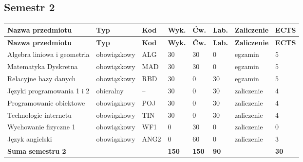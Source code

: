 \documentclass[12pt,a4paper]{article}
\newcommand{\thdrule}{\noalign{\global\setlength{\extrarowheight}{0pt}}}
\newcommand{\thdend}{\noalign{\global\setlength{\extrarowheight}{4pt}}}
\begin{document}
\subsection*{Semestr 2}

{\scriptsize
\begin{longtable}{m{5.0cm}m{1.9cm}m{0.75cm}m{0.85cm}m{0.85cm}m{0.85cm}m{1.45cm}m{0.9cm}}
\thdrule\toprule
\rowcolor{pjatkRed}
{\color{white}\footnotesize\textbf{\vphantom{Ag}Nazwa przedmiotu}} & {\color{white}\footnotesize\textbf{\vphantom{Ag}Typ}} & {\color{white}\footnotesize\textbf{\vphantom{Ag}Kod}} & {\color{white}\footnotesize\textbf{\vphantom{Ag}Wyk.}} & {\color{white}\footnotesize\textbf{\vphantom{Ag}Ćw.}} & {\color{white}\footnotesize\textbf{\vphantom{Ag}Lab.}} & {\color{white}\footnotesize\textbf{\vphantom{Ag}Zaliczenie}} & {\color{white}\footnotesize\textbf{\vphantom{Ag}ECTS}} \\
\midrule\thdend
\endfirsthead
\thdrule\toprule
\rowcolor{pjatkRed}
{\color{white}\footnotesize\textbf{\vphantom{Ag}Nazwa przedmiotu}} & {\color{white}\footnotesize\textbf{\vphantom{Ag}Typ}} & {\color{white}\footnotesize\textbf{\vphantom{Ag}Kod}} & {\color{white}\footnotesize\textbf{\vphantom{Ag}Wyk.}} & {\color{white}\footnotesize\textbf{\vphantom{Ag}Ćw.}} & {\color{white}\footnotesize\textbf{\vphantom{Ag}Lab.}} & {\color{white}\footnotesize\textbf{\vphantom{Ag}Zaliczenie}} & {\color{white}\footnotesize\textbf{\vphantom{Ag}ECTS}} \\
\midrule\thdend
\endhead
\rowcolor{tableRowLight} Algebra liniowa i geometria & {\scriptsize obowiązkowy} & ALG & 30 & 30 & 0 & {\scriptsize egzamin} & 5 \\
\rowcolor{tableRowAlt} Matematyka Dyskretna & {\scriptsize obowiązkowy} & MAD & 30 & 30 & 0 & {\scriptsize egzamin} & 5 \\
\rowcolor{tableRowLight} Relacyjne bazy danych & {\scriptsize obowiązkowy} & RBD & 30 & 0 & 30 & {\scriptsize egzamin} & 5 \\
\rowcolor{tableElective} Języki programowania 1 i 2 & {\scriptsize obieralny} & -- & 30 & 0 & 30 & {\scriptsize zaliczenie} & 4 \\
\rowcolor{tableRowAlt} Programowanie obiektowe & {\scriptsize obowiązkowy} & POJ & 30 & 0 & 30 & {\scriptsize zaliczenie} & 4 \\
\rowcolor{tableRowLight} Technologie internetu & {\scriptsize obowiązkowy} & TIN & 30 & 0 & 30 & {\scriptsize zaliczenie} & 4 \\
\rowcolor{tableRowAlt} Wychowanie fizyczne 1 & {\scriptsize obowiązkowy} & WF1 & 0 & 30 & 0 & {\scriptsize zaliczenie} & 0 \\
\rowcolor{tableRowLight} Język angielski & {\scriptsize obowiązkowy} & ANG2 & 0 & 60 & 0 & {\scriptsize zaliczenie} & 3 \\
\midrule[\heavyrulewidth]
\rowcolor{tableSummary} \textbf{Suma semestru 2} & & & \textbf{150} & \textbf{150} & \textbf{90} & & \textbf{30} \\
\bottomrule
\end{longtable}}
\end{document}
